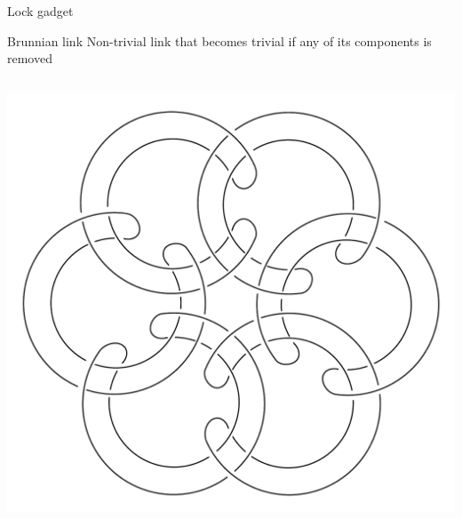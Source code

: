 \documentclass[11pt,xcolor=dvipsnames,presentation,aspectratio=169]{beamer}
\begin{document}
\begin{frame}{Lock gadget}
  \begin{block}{Brunnian link}
    Non-trivial link that becomes trivial if any of its components is removed
  \end{block}
  \begin{columns}
    \begin{column}{.47\linewidth}
      \centering
      \includegraphics[width=.7\linewidth]{rubberband.pdf}
    \end{column}
    \hfill
  \end{columns}
\end{frame}
\end{document}
